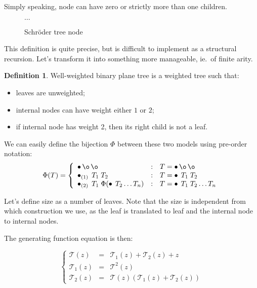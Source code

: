 \documentclass[final]{article}
\theoremstyle{definition}
\newtheorem{definition}{Definition}[subsection]
\theoremstyle{remark}
\newcommand{\gf}[1]{\ensuremath{\mathcal{#1}}}
\newcommand{\weighted}[1]{\ensuremath{_{(#1)}}}
\DeclareMathOperator{\n}{\bullet}
\DeclareMathOperator{\no}{\o}
\begin{document}
Simply speaking, node can have zero or strictly more than one children.

\begin{figure}[h]
    \centering
    
    
    
    
    \(\ldots\)
    \caption{Schröder tree node}
    \label{fig:schroder_trees}
\end{figure}

This definition is quite precise, but is difficult to implement as a structural recursion. Let's transform it into something more manageable, ie.~of finite arity.

\begin{definition}
    Well-weighted binary plane tree is a weighted tree such that:
    \begin{itemize}
        \item leaves are unweighted;
        \item internal nodes can have weight either \(1\) or \(2\);
        \item if internal node has weight 2, then its right child is not a leaf.
    \end{itemize}
\end{definition}

We can easily define the bijection \(\Phi\) between these two models using pre-order notation:
\[\Phi(T) = \left\{\begin{array}{lcl}
            \n \no \no &:& T = \n \no \no \\
            \n\weighted{1}\; T_1\; T_2 &:& T = \n\; T_1\; T_2\\
            \n\weighted{2}\; T_1\; \Phi(\n\; T_2 \ldots T_n) &:& T = \n\; T_1\; T_2 \ldots T_n
\end{array}\right.\]

Let's define size as a number of leaves. Note that the size is independent from which construction we use, as the leaf is translated to leaf and the internal node to internal nodes.

The generating function equation is then:

\[\left\{\begin{array}{rcl}
            \gf{T}(z) &=& \gf{T}_1(z) + \gf{T}_2(z) + z\\
            \gf{T}_1(z) &=& \gf{T}^2(z)\\
            \gf{T}_2(z) &=& \gf{T}(z)(\gf{T}_1(z) + \gf{T}_2(z))
\end{array}\right.\]
\end{document}
